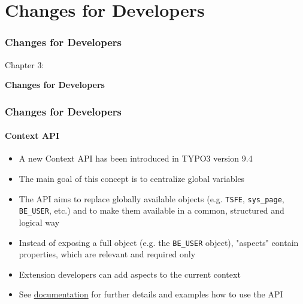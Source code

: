 %

\section{Changes for Developers}
\begin{frame}[fragile]
	\frametitle{Changes for Developers}

	\begin{center}\huge{Chapter 3:}\end{center}
	\begin{center}\huge{\color{typo3darkgrey}\textbf{Changes for Developers}}\end{center}

\end{frame}


\begin{frame}[fragile]
	\frametitle{Changes for Developers}
	\framesubtitle{Context API}

	\begin{itemize}
		\item A new Context API has been introduced in TYPO3 version 9.4
		\item The main goal of this concept is to centralize global variables
		\item The API aims to replace globally available objects (e.g.
			\texttt{TSFE}, \texttt{sys\_page}, \texttt{BE\_USER}, etc.) and to
			make them available in a common, structured and logical way
		\item Instead of exposing a full object (e.g. the \texttt{BE\_USER}
			object), "aspects" contain properties, which are relevant and
			required only
		\item Extension developers can add aspects to the current context
		\item See \href{https://docs.typo3.org/typo3cms/extensions/core/latest/Changelog/9.4/Feature-85389-ContextAPIForConsistentDataHandling.rst}{documentation}
			for further details and examples how to use the API
	\end{itemize}

\end{frame}

